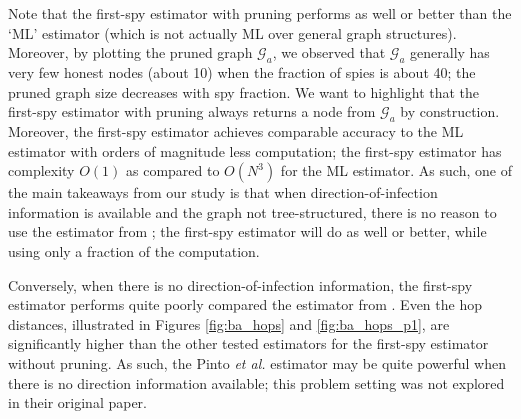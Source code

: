 Note that the first-spy estimator with pruning performs as well or better than the `ML' estimator (which is not actually ML over general graph structures). Moreover, by plotting the pruned graph $\mathcal G_a$, we observed that $\mathcal G_a$ generally has very few honest nodes (about 10) when the fraction of spies is about 40; the pruned graph size decreases with spy fraction. 
We want to highlight that the first-spy estimator with pruning always returns a node from $\mathcal G_a$ by construction.  Moreover, the first-spy estimator achieves comparable accuracy to the ML estimator with orders of magnitude less computation; the first-spy estimator has complexity $O(1)$ as compared to $O(N^3)$ for the ML estimator. As such, one of the main takeaways from our study is that when direction-of-infection information is available and the graph not tree-structured, there is no reason to use the estimator from \cite{pinto}; the first-spy estimator will do as well or better, while using only a fraction of the computation. 

Conversely, when there is no direction-of-infection information, the first-spy estimator performs quite poorly compared the estimator from \cite{pinto}. Even the hop distances, illustrated in Figures \ref{fig:ba_hops} and \ref{fig:ba_hops_p1}, are significantly higher than the other tested estimators for the first-spy estimator without pruning. As such, the Pinto \emph{et al.} estimator may be quite powerful when there is no direction information available; this problem setting was not explored in their original paper.

